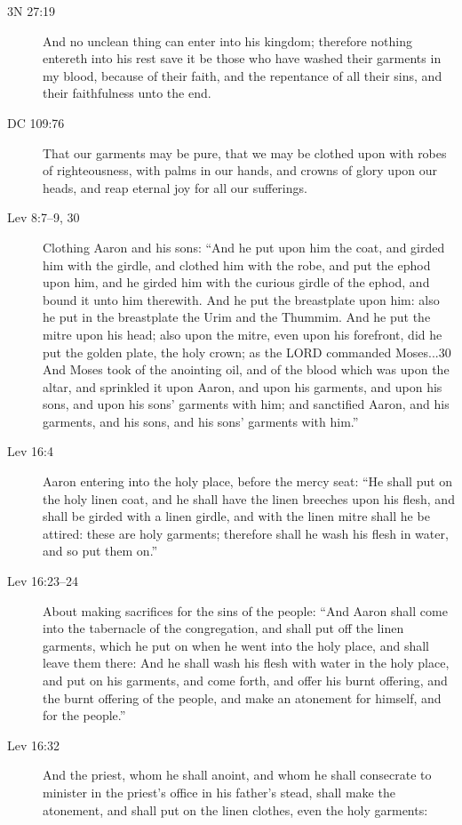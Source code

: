 		\begin{description}
		\item[3N 27:19] And no unclean thing can enter into his kingdom; therefore nothing entereth into his rest save it be those who have washed their garments in my blood, because of their faith, and the repentance of all their sins, and their faithfulness unto the end.
		\item[DC 109:76] That our garments may be pure, that we may be clothed upon with robes of righteousness, with palms in our hands, and crowns of glory upon our heads, and reap eternal joy for all our sufferings.
		\item[Lev 8:7--9, 30] Clothing Aaron and his sons: ``And he put upon him the coat, and girded him with the girdle, and clothed him with the robe, and put the ephod upon him, and he girded him with the curious girdle of the ephod, and bound it unto him therewith. And he put the breastplate upon him: also he put in the breastplate the Urim and the Thummim. And he put the mitre upon his head; also upon the mitre, even upon his forefront, did he put the golden plate, the holy crown; as the LORD commanded Moses...30 And Moses took of the anointing oil, and of the blood which was upon the altar, and sprinkled it upon Aaron, and upon his garments, and upon his sons, and upon his sons' garments with him; and sanctified Aaron, and his garments, and his sons, and his sons' garments with him.''
		\item[Lev 16:4] Aaron entering into the holy place, before the mercy seat: ``He shall put on the holy linen coat, and he shall have the linen breeches upon his flesh, and shall be girded with a linen girdle, and with the linen mitre shall he be attired: these are holy garments; therefore shall he wash his flesh in water, and so put them on.''
		\item[Lev 16:23--24] About making sacrifices for the sins of the people: ``And Aaron shall come into the tabernacle of the congregation, and shall put off the linen garments, which he put on when he went into the holy place, and shall leave them there: And he shall wash his flesh with water in the holy place, and put on his garments, and come forth, and offer his burnt offering, and the burnt offering of the people, and make an atonement for himself, and for the people.''
		\item[Lev 16:32] And the priest, whom he shall anoint, and whom he shall consecrate to minister in the priest's office in his father's stead, shall make the atonement, and shall put on the linen clothes, even the holy garments:

\end{description}
